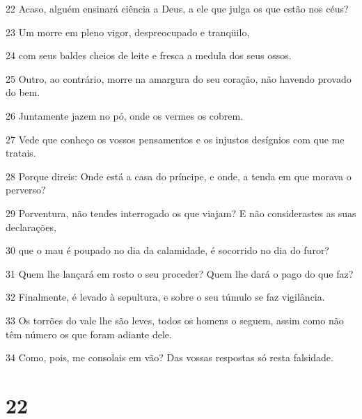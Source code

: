 \par 22 Acaso, alguém ensinará ciência a Deus, a ele que julga os que estão nos céus?
\par 23 Um morre em pleno vigor, despreocupado e tranqüilo,
\par 24 com seus baldes cheios de leite e fresca a medula dos seus ossos.
\par 25 Outro, ao contrário, morre na amargura do seu coração, não havendo provado do bem.
\par 26 Juntamente jazem no pó, onde os vermes os cobrem.
\par 27 Vede que conheço os vossos pensamentos e os injustos desígnios com que me tratais.
\par 28 Porque direis: Onde está a casa do príncipe, e onde, a tenda em que morava o perverso?
\par 29 Porventura, não tendes interrogado os que viajam? E não considerastes as suas declarações,
\par 30 que o mau é poupado no dia da calamidade, é socorrido no dia do furor?
\par 31 Quem lhe lançará em rosto o seu proceder? Quem lhe dará o pago do que faz?
\par 32 Finalmente, é levado à sepultura, e sobre o seu túmulo se faz vigilância.
\par 33 Os torrões do vale lhe são leves, todos os homens o seguem, assim como não têm número os que foram adiante dele.
\par 34 Como, pois, me consolais em vão? Das vossas respostas só resta falsidade.

\chapter{22}


